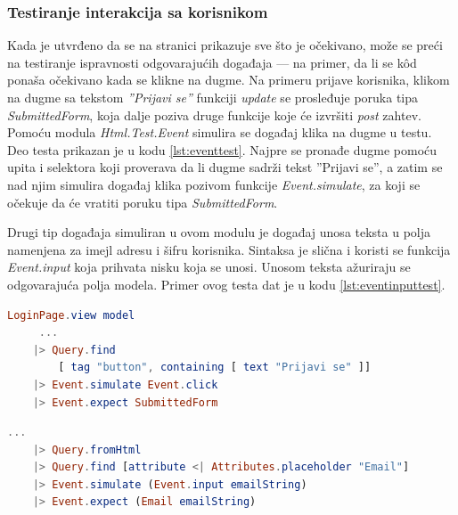 \documentclass[12pt,oneside]{memoir}
\begin{document}
\subsubsection{Testiranje interakcija sa korisnikom}

\par Kada je utvrđeno da se na stranici prikazuje sve što je očekivano, može se preći na testiranje ispravnosti odgovarajućih događaja --- na primer, da li se k\^{o}d ponaša očekivano kada se klikne na dugme. Na primeru prijave korisnika, klikom na dugme sa tekstom \emph{''Prijavi se''} funkciji \emph{update} se prosleđuje poruka tipa \emph{SubmittedForm}, koja dalje poziva druge funkcije koje će izvršiti \emph{post} zahtev. Pomoću modula \emph{Html.Test.Event} simulira se događaj klika na dugme u testu. Deo testa prikazan je u kodu \ref{lst:eventtest}. Najpre se pronađe dugme pomoću upita i selektora koji proverava da li dugme sadrži tekst ''Prijavi se'', a zatim se nad njim simulira događaj klika pozivom funkcije \emph{Event.simulate}, za koji se očekuje da će vratiti poruku tipa \emph{SubmittedForm}. 
\par Drugi tip događaja simuliran u ovom modulu je događaj unosa teksta u polja namenjena za imejl adresu i šifru korisnika. Sintaksa je slična i koristi se funkcija \emph{Event.input} koja prihvata nisku koja se unosi. Unosom teksta ažuriraju se odgovarajuća polja modela. Primer ovog testa dat je u kodu \ref{lst:eventinputtest}. 

\begin{minipage}{\linewidth}
\begin{lstlisting}[language=elm, basicstyle=\small, caption={Simulacija događaja klika na dugme u testu funkcije \emph{view} modula \emph{LoginPage}},captionpos=b, label={lst:eventtest}]
LoginPage.view model
     ... 
    |> Query.find
        [ tag "button", containing [ text "Prijavi se" ]]
    |> Event.simulate Event.click
    |> Event.expect SubmittedForm
\end{lstlisting}
\end{minipage}

\begin{minipage}{\linewidth}
\begin{lstlisting}[language=elm, basicstyle=\small, caption={Simulacija događaja unosa teksta u testu funkcije \emph{view} modula \emph{LoginPage}},captionpos=b, label={lst:eventinputtest}]
    ...
    |> Query.fromHtml
    |> Query.find [attribute <| Attributes.placeholder "Email"]
    |> Event.simulate (Event.input emailString)
    |> Event.expect (Email emailString)
\end{lstlisting}
\end{minipage}
\end{document}
